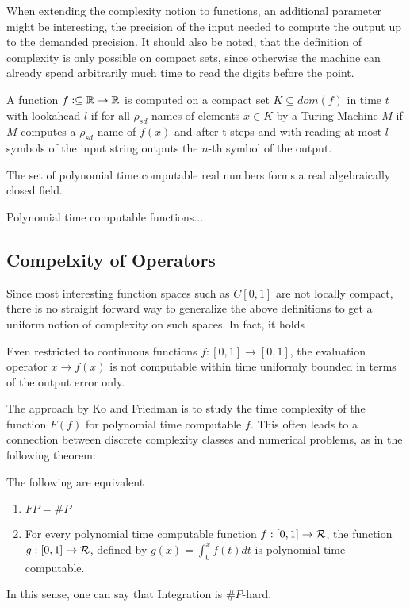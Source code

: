 		When extending the complexity notion to functions, an additional parameter might be interesting, the precision of the input
		needed to compute the output up to the demanded precision.
		It should also be noted, that the definition of complexity is only possible on compact sets, since otherwise the machine can already
		spend arbitrarily much time to read the digits before the point.
		\begin{definition}
			A function $f: \subseteq \mathbb R \to \mathbb R$ is computed on a compact set $K \subseteq dom(f)$ in time $t$ with lookahead $l$ if for all $\rho_{sd}$-names of elements $ x \in K$ by a Turing Machine $M$ if $M$ computes a $\rho_{sd}$-name of $f(x)$ and after t steps and with reading at most $l$ symbols of the input string outputs the $n$-th symbol of the output.   
		\end{definition} 
		\begin{theorem}
			The set of polynomial time computable real numbers forms a real algebraically closed field.
		\end{theorem}
		\begin{example}
		Polynomial time computable functions...
		\end{example}
	\subsection{Compelxity of Operators}
		Since most interesting function spaces such as $C[0,1]$ are not locally compact,
		there is no straight forward way to generalize the above definitions to get a uniform notion of complexity on such spaces.
		In fact, it holds
		\begin{theorem}
			Even restricted to continuous functions $f: [0,1] \to [0,1]$, the evaluation operator $x \to f(x)$ is not computable within time uniformly bounded in terms of the output error only.
		\end{theorem}
		The approach by Ko and Friedman \cite{KoBook} is to study the time complexity of the function $F(f)$ for polynomial time computable $f$.
		This  often leads to a connection between discrete complexity classes and numerical problems, as in the following theorem:
		\begin{theorem}
			The following are equivalent
			\begin{enumerate}
				\item $FP = \#P$
				\item For every polynomial time computable function $f: [0,1] \to \mathcal R$, the function
					$g: [0,1] \to \mathcal R$, defined by $g(x) = \int_0^x f(t) dt$ is polynomial time computable.
			\end{enumerate} 
		\end{theorem}
		In this sense, one can say that Integration is $\#P$-hard.

